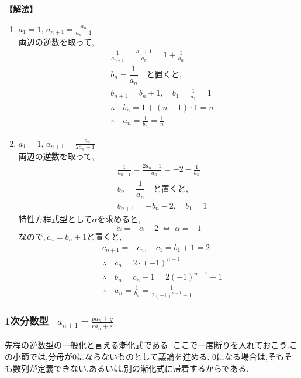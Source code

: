 \noindent\textbf{【解法】}
\begin{enumerate}[label=(\arabic*),parsep=3pt]
  \item $\displaystyle a_1=1,\, a_{n+1}=\frac{a_n}{a_n+1}$\\
        両辺の逆数を取って,
        \begin{align*}
           & \frac{1}{a_{n+1}}=\frac{a_n+1}{a_n}=1+\frac{1}{a_n} \\
                & b_n=\dfrac{1}{a_n} \quad \text{と置くと,}                    \\
           & b_{n+1}=b_n+1,\quad b_1=\frac{1}{a_1}=1             \\
           & \therefore \quad b_n=1+(n-1)\cdot1=n                \\
           & \therefore \quad a_n=\frac{1}{b_n}=\frac{1}{n}
        \end{align*}
  \item $\displaystyle a_1=1,\, a_{n+1}=\frac{-a_n}{2a_n+1}$\\
        両辺の逆数を取って,
        \begin{align*}
           & \frac{1}{a_{n+1}}=\frac{2a_n+1}{-a_n}=-2-\frac{1}{a_n} \\
                & b_n=\dfrac{1}{a_n} \quad \text{と置くと,}                       \\
           & b_{n+1}=-b_n-2,\quad b_1=1
        \end{align*}
        特性方程式型として$\alpha$を求めると,
        \[
          \alpha=-\alpha-2 \ \Leftrightarrow\ \alpha=-1
        \]
        なので,\,$c_n=b_n+1$と置くと,
        \begin{align*}
           & c_{n+1}=-c_n,\quad c_1=b_1+1=2                             \\
           & \therefore \quad c_n=2\cdot(-1)^{n-1}                      \\
           & \therefore \quad b_n=c_n-1=2(-1)^{n-1}-1                   \\
           & \therefore \quad a_n=\frac{1}{b_n}=\frac{1}{2(-1)^{n-1}-1}
        \end{align*}
\end{enumerate}
\subsubsection{1次分数型 \, $\displaystyle a_{n+1}=\frac{pa_n+q}{ra_n+s}$}
先程の逆数型の一般化と言える漸化式である.
ここで一度断りを入れておこう.この小節では,分母が0にならないものとして議論を進める.
0になる場合は,そもそも数列が定義できない,あるいは,別の漸化式に帰着するからである.

